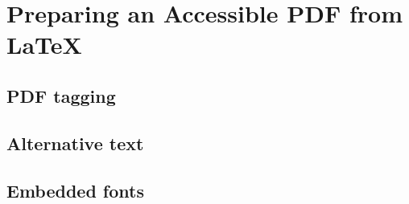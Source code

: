 \section{Preparing an Accessible PDF from LaTeX}\label{sec:PDFPrep}


\subsection{PDF tagging}\label{sec:PDFPrep_Tagging}


\subsection{Alternative text}\label{sec:PDFPrep_AltText}


\subsection{Embedded fonts}\label{sec:PDFPrep_EmbeddedFonts}
